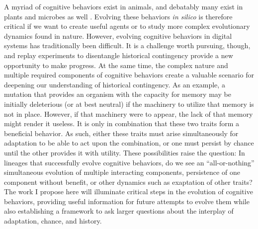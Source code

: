 
A myriad of cognitive behaviors exist in animals, and debatably many exist in plants and microbes as well \citep{loyWhereAssociationEnds2021, dussutourLearningSingleCell2021a}. 
Evolving these behaviors \textit{in silico} is therefore critical if we want to create useful agents or to study more complex evolutionary dynamics found in nature. 
However, evolving cognitive behaviors in digital systems has traditionally been difficult. 
It is a challenge worth pursuing, though, and replay experiments to disentangle historical contingency provide a new opportunity to make progress.
At the same time, the complex nature and multiple required components of cognitive behaviors create a valuable scenario for deepening our understanding of historical contingency. 
As an example, a mutation that provides an organism with the capacity for memory may be initially deleterious (or at best neutral) if the machinery to utilize that memory is not in place.
However, if that machinery were to appear, the lack of that memory might render it useless.
It is only in combination that these two traits form a beneficial behavior.
As such, either these traits must arise simultaneously for adaptation to be able to act upon the combination, or one must persist by chance until the other provides it with utility.
These possibilities raise the question: In lineages that successfully evolve cognitive behaviors, do we see an ``all-or-nothing'' simultaneous evolution of multiple interacting components, persistence of one component without benefit, or other dynamics such as exaptation of other traits?
The work I propose here will illuminate critical steps in the evolution of cognitive behaviors, providing useful information for future attempts to evolve them while also establishing a framework to ask larger questions about the interplay of adaptation, chance, and history. 

